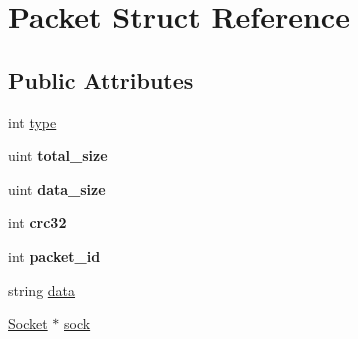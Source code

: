 \hypertarget{structPacket}{\section{\-Packet \-Struct \-Reference}
\label{structPacket}
}
\subsection*{\-Public \-Attributes}
\begin{DoxyCompactItemize}
\item 
int \hyperlink{structPacket_a54aec3ba8853c913416e1fff792bfa84}{type}
\item 
\hypertarget{structPacket_a54f5590e5b8176ec03f0fa3092be15da}{uint {\bfseries total\-\_\-size}}\label{structPacket_a54f5590e5b8176ec03f0fa3092be15da}

\item 
\hypertarget{structPacket_ab9fb71f0c84e3a533a2f68a1f6f010db}{uint {\bfseries data\-\_\-size}}\label{structPacket_ab9fb71f0c84e3a533a2f68a1f6f010db}

\item 
\hypertarget{structPacket_aacf78aeff0ab621b64f39deced2e65ae}{int {\bfseries crc32}}\label{structPacket_aacf78aeff0ab621b64f39deced2e65ae}

\item 
\hypertarget{structPacket_aa3b599c7fc83fa578985941d0414bb17}{int {\bfseries packet\-\_\-id}}\label{structPacket_aa3b599c7fc83fa578985941d0414bb17}

\item 
string \hyperlink{structPacket_a98961f942ac0ff932175cd8558b93814}{data}
\item 
\hyperlink{classSocket}{\-Socket} $\ast$ \hyperlink{structPacket_ac939137a80df54d936b34c1135237235}{sock}
\end{DoxyCompactItemize}


